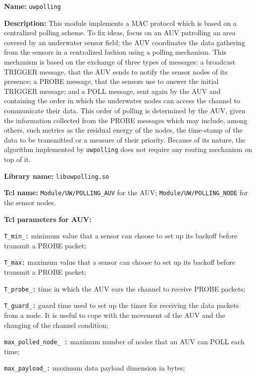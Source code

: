 \vspace{1 cm}

\begin{description}
   \item {\bf Name:} {\tt uwpolling}
   \item {\bf Description:}  This module implements a MAC protocol which is based on a centralized polling scheme. To fix ideas, focus on an AUV patrolling an area covered by an underwater sensor field; the AUV coordinates the data gathering from the sensors in a centralized fashion using a polling mechanism. This mechanism is based on the exchange of three types of messages: a broadcast TRIGGER message, that the AUV sends to notify the sensor nodes of its presence; a PROBE message, that the sensors use to answer the initial TRIGGER message; and a POLL message, sent again by the AUV and containing the order in which the underwater nodes can access the channel to communicate their data. 
   This order of polling is determined by the AUV, given the information collected from the PROBE messages which may include, among others, such metrics as the residual energy of the nodes, the time-stamp of the data to be transmitted or a measure of their priority. Because of its nature, the algorithm implemented by {\tt uwpolling} does not require any routing mechanism on top of it.
   \item {\bf Library name:} {\tt libuwpolling.so}
   \item {\bf Tcl name:} {\tt Module/UW/POLLING\_AUV} for the AUV; {\tt Module/UW/POLLING\_NODE} for the sensor nodes. 
   \item {\bf Tcl parameters for AUV:} 
   	\begin{description}
		\item	{\tt T\_min\_:} minimum value that a sensor can choose to set up its backoff before transmit a PROBE packet;
		\item	{\tt T\_max:} maximum value that a sensor can choose to set up its backoff before transmit a PROBE packet;
		\item	{\tt T\_probe\_:} time in which the AUV ears the channel to receive PROBE packets;
		\item	{\tt T\_guard\_:} guard time used to set up the timer for receiving the data packets from a node. It is useful to cope with the movement of the AUV and the changing of the channel condition;
		\item	{\tt max\_polled\_node\_ :} maximum number of nodes that an AUV can POLL each time;
		\item 	{\tt max\_payload\_:} maximum data payload dimension in bytes;

\end{description}
\end{description}
